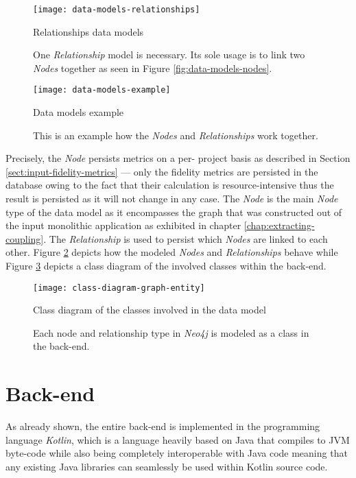 \documentclass[12pt,a4paper]{report}
\begin{document}
\begin{figure}[htbp]
\centering
\texttt{[image: data-models-relationships]}
\caption{Relationships data models}
\caption*{\centering
  One \textit{Relationship} model is necessary. Its sole usage is to link
  two  \textit{Nodes} together as seen in Figure \ref{fig:data-models-nodes}.
}
\label{fig:data-models-relationships}
\end{figure}

\begin{figure}[htbp]
\centering
\texttt{[image: data-models-example]}
\caption{Data models example}
\caption*{\centering
  This is an example how the \textit{Nodes} and \textit{Relationships} work together.
}
\label{fig:data-models-example}
\end{figure}

Precisely, the  \textit{Node} persists metrics on a per\hyp
project basis as described in Section \ref{sect:input-fidelity-metrics} ---
only the fidelity metrics are persisted in the database owing to the fact that
their calculation is resource\hyp intensive thus the result is persisted as it
will not change in any case. The  \textit{Node} is the main \textit{Node}
type of the data model as it encompasses the graph that was constructed
out of the input monolithic application as exhibited in chapter
\ref{chap:extracting-coupling}. The  \textit{Relationship}
is used to persist which  \textit{Nodes} are linked to each other.
Figure \ref{fig:data-models-example} depicts how the modeled \textit{Nodes}
and \textit{Relationships} behave while Figure \ref{fig:class-diagram-graph-entity}
depicts a class diagram of the involved classes within the back-end.

\begin{figure}[htbp]
\centering
\texttt{[image: class-diagram-graph-entity]}
\caption{Class diagram of the classes involved in the data model}
\caption*{\centering
  Each node and relationship type in \textit{Neo4j} is modeled as a class
  in the back-end.
}
\label{fig:class-diagram-graph-entity}
\end{figure}



\section{Back-end} \label{sect:implementation-back-end}

As already shown, the entire back-end is implemented in the programming
language \textit{Kotlin}, which is a language heavily based on Java that
compiles to JVM byte-code while also being completely interoperable with Java
code meaning that any existing Java libraries can seamlessly be used within
Kotlin source code.
\end{document}

